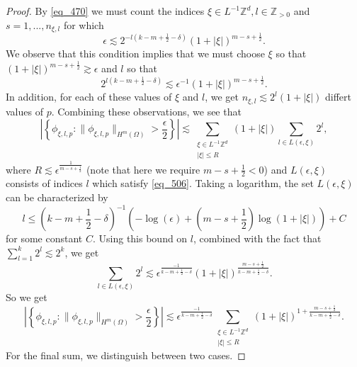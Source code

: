 \begin{proof}
 By \eqref{eq_470} we must count the indices $\xi\in L^{-1}\mathbb{Z}^d,l\in \mathbb{Z}_{>0}$ and $s=1,...,n_{\xi,l}$ for which
 \begin{equation}
  \epsilon \lesssim 2^{-l(k-m+\frac{1}{2}-\delta)}(1+|\xi|)^{m-s+\frac{1}{2}}.
 \end{equation}
 We observe that this condition implies that we must choose $\xi$ so that $(1+|\xi|)^{m-s+\frac{1}{2}} \gtrsim \epsilon$ and $l$ so that
 \begin{equation}\label{eq_506}
  2^{l(k-m+\frac{1}{2}-\delta)} \lesssim \epsilon^{-1}(1+|\xi|)^{m-s+\frac{1}{2}}.
 \end{equation}
 In addition, for each of these values of $\xi$ and $l$, we get $n_{\xi,l}\lesssim 2^l(1+|\xi|)$ differt values of $p$. Combining these observations, we see that
 \begin{equation}
  \left|\left\{\phi_{\xi,l,p}: \|\phi_{\xi,l,p}\|_{H^m(\Omega)} > \frac{\epsilon}{2}\right\}\right| \lesssim \sum_{\substack{\xi\in L^{-1}\mathbb{Z}^d\\|\xi|\leq R}} (1+|\xi|) \sum_{l\in L(\epsilon,\xi)} 2^l,
 \end{equation}
 where $R \lesssim \epsilon^{\frac{1}{m-s+\frac{1}{2}}}$ (note that here we require $m-s+\frac{1}{2} < 0$) and $L(\epsilon,\xi)$ consists of indices $l$ which satisfy \eqref{eq_506}. Taking a logarithm, the set $L(\epsilon,\xi)$ can be characterized by
 \begin{equation}
  l\leq \left(k-m+\frac{1}{2}-\delta\right)^{-1}\left(-\log(\epsilon) + \left(m-s+\frac{1}{2}\right)\log(1+|\xi|)\right) + C
 \end{equation}
 for some constant $C$. Using this bound on $l$, combined with the fact that $\sum_{l=1}^k 2^l \lesssim 2^k$, we get
 \begin{equation}
  \sum_{l\in L(\epsilon,\xi)} 2^l \lesssim \epsilon^{\frac{-1}{k-m+\frac{1}{2}-\delta}}(1+|\xi|)^{\frac{m-s+\frac{1}{2}}{k-m+\frac{1}{2}-\delta}}.
 \end{equation}
 So we get
 \begin{equation}\label{eq_524}
  \left|\left\{\phi_{\xi,l,p}: \|\phi_{\xi,l,p}\|_{H^m(\Omega)} > \frac{\epsilon}{2}\right\}\right| \lesssim \epsilon^{\frac{-1}{k-m+\frac{1}{2}-\delta}} \sum_{\substack{\xi\in L^{-1}\mathbb{Z}^d\\|\xi|\leq R}} (1+|\xi|)^{1 + \frac{m-s+\frac{1}{2}}{k-m+\frac{1}{2}-\delta}}.
 \end{equation}
 For the final sum, we distinguish between two cases. 
 

\end{proof}
